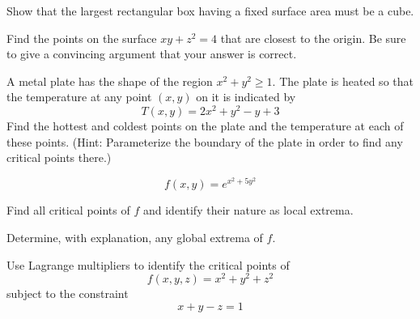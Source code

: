 \documentclass[boxes]{gsypset}
\begin{document}
	\begin{problem}[4.2.28]
		Show that the largest rectangular box having a fixed surface area must be a cube.
	\end{problem}
	\begin{solution}
		
	\end{solution}
	
	\begin{problem}[4.2.30]
		Find the points on the surface $xy + z^2 = 4$ that are closest to the origin.
		Be sure to give a convincing argument that your answer is correct.
	\end{problem}
	\begin{solution}
		
	\end{solution}
	
	\begin{problem}[4.2.34]
		A metal plate has the shape of the region $x^2 + y^2 \geq 1$.
		The plate is heated so that the temperature at any point $(x,y)$ on it is indicated by
		\[
			T(x,y) = 2x^2 + y^2 - y + 3
		\]
		Find the hottest and coldest points on the plate and the temperature at each of these points.
		(Hint: Parameterize the boundary of the plate in order to find any critical points there.)
	\end{problem}
	\begin{solution}
		
	\end{solution}
	
	\begin{problem}[4.2.46]
		\[
			f(x,y) = e^{x^2 + 5y^2}
		\]
		\begin{subproblems}
			\subproblem Find all critical points of $f$ and identify their nature as local extrema.
				\begin{solution}
					
				\end{solution}
				
			\subproblem Determine, with explanation, any global extrema of $f$.
				\begin{solution}
					
				\end{solution}
		\end{subproblems}
	\end{problem}
	
	\begin{problem}[4.3.6]
		Use Lagrange multipliers to identify the critical points of
		\[
			f(x,y,z) = x^2 + y^2 + z^2
		\]
		subject to the constraint
		\[
			x+y-z = 1
		\]
	\end{problem}
	\begin{solution}
		
	\end{solution}
	
\end{document}

